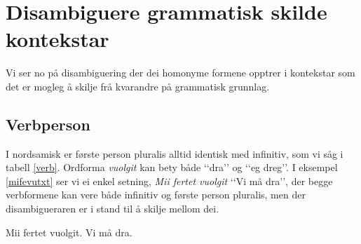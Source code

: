 \documentclass[a4paper,norsk]{article}
\begin{document}
% 
% 
% 


\section{Disambiguere grammatisk skilde kontekstar}



Vi ser no på disambiguering der dei homonyme formene opptrer i kontekstar som det er mogleg å skilje frå kvarandre på grammatisk grunnlag. %

\subsection{Verbperson}

I nordsamisk er første person pluralis alltid identisk med infinitiv, som vi såg i tabell \ref{verb}. Ordforma \emph{vuolgit} kan bety både ‘‘dra’’ og ‘‘eg dreg’’. I eksempel \ref{mifevutxt} ser vi ei enkel setning, \emph{Mii fertet vuolgit} ‘‘Vi må dra’’,  der begge verbformene kan vere både infinitiv og første person pluralis, men der disambigueraren er i stand til å skilje mellom dei. %

\begin{example}\label{mifevutxt}
\gll Mii fertet vuolgit.
 Vi må dra.
\gln 
\glend
\end{example}
\end{document}
